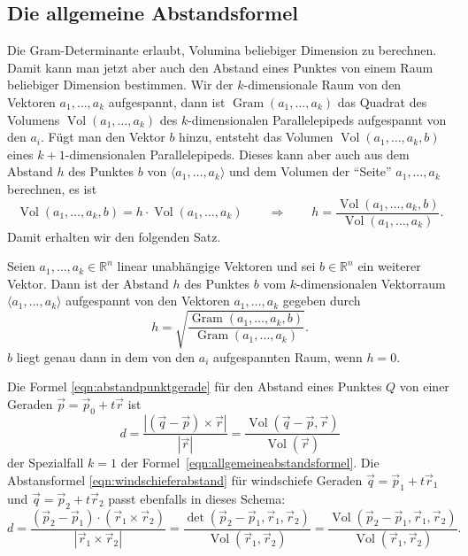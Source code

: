 \subsection{Die allgemeine Abstandsformel
\label{subsection:allgemeineabstandsformel}}
Die Gram-Determinante erlaubt, Volumina beliebiger Dimension zu berechnen.
Damit kann man jetzt aber auch den Abstand eines Punktes von einem 
Raum beliebiger Dimension bestimmen.
Wir der $k$-dimensionale Raum von den Vektoren $a_1,\dots,a_k$ aufgespannt,
dann ist $\operatorname{Gram}(a_1,\dots,a_k)$ das Quadrat des
Volumens $\operatorname{Vol}(a_1,\dots,a_k)$ des $k$-dimensionalen
Parallelepipeds aufgespannt von den $a_i$.
Fügt man den Vektor $b$ hinzu, entsteht das Volumen
$\operatorname{Vol}(a_1,\dots,a_k,b)$ eines $k+1$-dimensionalen
Parallelepipeds.
Dieses kann aber auch aus dem Abstand $h$ des Punktes $b$ von
$\langle a_1,\dots,a_k\rangle$ und dem Volumen der ``Seite''
$a_1,\dots,a_k$ berechnen, es ist
\[
\operatorname{Vol}(a_1,\dots,a_k,b)
=
h\cdot
\operatorname{Vol}(a_1,\dots,a_k)
\qquad\Rightarrow\qquad
h
=
\frac{
\operatorname{Vol}(a_1,\dots,a_k,b)
}{
\operatorname{Vol}(a_1,\dots,a_k)
}.
\]
Damit erhalten wir den folgenden Satz.

\begin{satz}
Seien $a_1,\dots,a_k\in\mathbb{R}^n$ linear unabhängige Vektoren und
sei $b\in\mathbb{R}^n$ ein weiterer Vektor.
Dann ist der Abstand $h$ des Punktes $b$ vom $k$-dimensionalen Vektorraum
$\langle a_1,\dots,a_k\rangle$ aufgespannt von den Vektoren
$a_1,\dots,a_k$ gegeben durch
\begin{equation}
h = \sqrt{
\frac{\operatorname{Gram}(a_1,\dots,a_k,b)}{\operatorname{Gram}(a_1,\dots,a_k)}
}.
\label{eqn:allgemeineabstandsformel}
\end{equation}
$b$ liegt genau dann in dem von den $a_i$ aufgespannten Raum, wenn $h=0$.
\end{satz}

Die Formel \eqref{eqn:abstandpunktgerade} für den Abstand eines Punktes
$Q$ von einer Geraden
$\vec{p} = \vec{p}_0+t\vec{r}$ ist
\[
d
=
\frac{|(\vec{q}-\vec{p})\times\vec{r}|}{|\vec{r}|}
=
\frac{
\operatorname{Vol}(\vec{q}-\vec{p},\vec{r})
}{
\operatorname{Vol}(\vec{r})
}
\]
der Spezialfall $k=1$ der Formel~\eqref{eqn:allgemeineabstandsformel}.
Die Abstansformel \eqref{eqn:windschieferabstand} für windschiefe Geraden
$\vec{q}=\vec{p}_{1}+t\vec{r}_1$
und
$\vec{q}=\vec{p}_{2}+t\vec{r}_2$
passt ebenfalls in dieses Schema:
\[
d
=
\frac{
(\vec{p}_2-\vec{p}_1)\cdot (\vec{r}_1\times\vec{r}_2)
}{
|\vec{r}_1\times\vec{r}_2|
}
=
\frac{
\det(\vec{p}_2-\vec{p}_1,\vec{r}_1,\vec{r}_2)
}{
\operatorname{Vol}(\vec{r}_1,\vec{r}_2)
}
=
\frac{
\operatorname{Vol}(\vec{p}_2-\vec{p}_1,\vec{r}_1,\vec{r}_2)
}{
\operatorname{Vol}(\vec{r}_1,\vec{r}_2)
}.
\]


